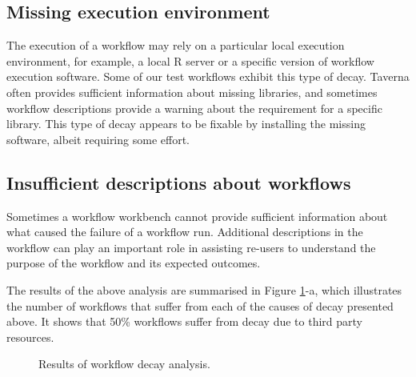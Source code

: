 \subsection{Missing execution environment}
The execution of a workflow may rely on a particular local execution environment, for example, a local R server or a specific version of workflow execution software. Some of our test workflows exhibit this type of decay. Taverna often provides sufficient information about missing libraries, and sometimes workflow descriptions provide a warning about the requirement for a specific library. This type of decay appears to be fixable by installing the missing software, albeit requiring some effort.

\subsection{Insufficient descriptions about workflows}
Sometimes a workflow workbench cannot provide sufficient information about what caused the failure of a workflow run. Additional descriptions in the workflow can play an important role in assisting re-users to understand the purpose of the workflow and its expected outcomes.



The results of the above analysis are summarised in Figure \ref{fig:decay-analysis}-a, which illustrates the number of workflows that suffer from each of the causes of decay presented above. It shows that {50\%} workflows suffer from decay due to third party resources. 

\begin{figure}[ht]
\centering
{}
\caption{Results of workflow decay analysis.}
\label{fig:decay-analysis}
\end{figure}


